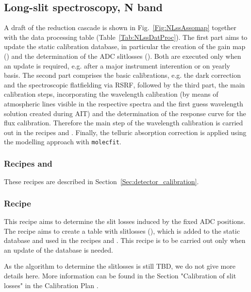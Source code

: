\clearpage
\subsection{Long-slit spectroscopy, N band}
\label{ssec:recipes_lss_n}
A draft of the reduction cascade is shown in
Fig.~\ref{Fig:NLssAssomap} together with the data processing table
(Table~\ref{Tab:NLssDatProc}). The first part aims to update the static calibration database, in particular the creation of the gain map () and the determination of the \ac{ADC} slitlosses (). Both are executed only when an update is required, e.g. after a major instrument interention or on yearly basis. The second part comprises the basic
calibrations, e.g. the 
dark correction and the spectroscopic flatfielding via \ac{RSRF}, followed by the third part, the main calibration steps, incorporating the wavelength calibration (by means of atmospheric lines visible in the respective spectra and the first guess wavelength solution created during \ac{AIT}) and the determination of the response curve for the flux calibration. Therefore the main step of the wavelength calibration is carried out in the recipes  and . Finally, the telluric absorption correction is applied using the modelling approach with \texttt{molecfit}.
\subsubsection{Recipes  and }
These recipes are described in Section~\ref{Sec:detector_calibration}.
\subsubsection{Recipe }
This recipe aims to determine the slit losses induced by the fixed \ac{ADC} positions. The recipe aims to create a table with slitlosses (), which is added to the static database and used in the recipes  and . This recipe is to be carried out only when an update of the database is needed.

As the algorithm to determine the slitlosses is still TBD, we do not give more details here. More information can be found in the Section "Calibration of slit losses" in the Calibration Plan \cite{METIS-calibration_plan}. 

